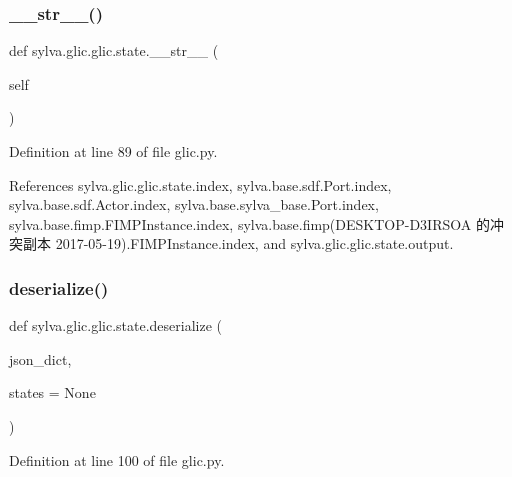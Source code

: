 \subsubsection{\texorpdfstring{\+\_\+\+\_\+str\+\_\+\+\_\+()}{\_\_str\_\_()}}
{\footnotesize\ttfamily def sylva.\+glic.\+glic.\+state.\+\_\+\+\_\+str\+\_\+\+\_\+ (\begin{DoxyParamCaption}\item[{}]{self }\end{DoxyParamCaption})}



Definition at line 89 of file glic.\+py.



References sylva.\+glic.\+glic.\+state.\+index, sylva.\+base.\+sdf.\+Port.\+index, sylva.\+base.\+sdf.\+Actor.\+index, sylva.\+base.\+sylva\+\_\+base.\+Port.\+index, sylva.\+base.\+fimp.\+F\+I\+M\+P\+Instance.\+index, sylva.\+base.\+fimp(\+D\+E\+S\+K\+T\+O\+P-\/\+D3\+I\+R\+S\+O\+A 的冲突副本 2017-\/05-\/19).\+F\+I\+M\+P\+Instance.\+index, and sylva.\+glic.\+glic.\+state.\+output.


\mbox{\label{classsylva_1_1glic_1_1glic_1_1state_a00c5deb1533d0282be3a43587d483a2a}} 
\subsubsection{\texorpdfstring{deserialize()}{deserialize()}}
{\footnotesize\ttfamily def sylva.\+glic.\+glic.\+state.\+deserialize (\begin{DoxyParamCaption}\item[{}]{json\+\_\+dict,  }\item[{}]{states = {\ttfamily None} }\end{DoxyParamCaption})\hspace{0.3cm}{\ttfamily [static]}}



Definition at line 100 of file glic.\+py.


